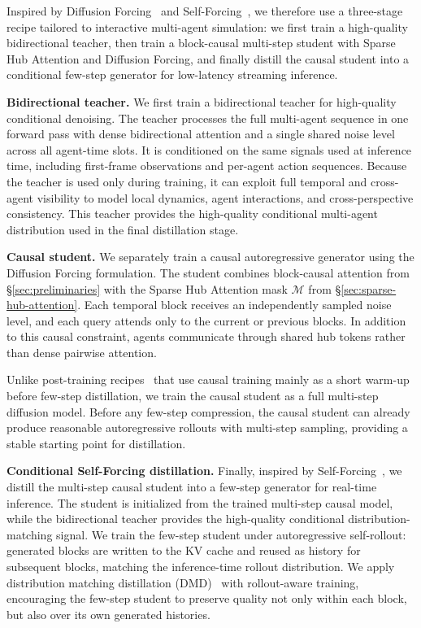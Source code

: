 \documentclass{llmxive}
\begin{document}
Inspired by Diffusion Forcing~\cite{chen2024diffusion} and Self-Forcing~\cite{huang2025self}, we therefore use a three-stage recipe tailored to interactive multi-agent simulation: we first train a high-quality bidirectional teacher, then train a block-causal multi-step student with Sparse Hub Attention and Diffusion Forcing, and finally distill the causal student into a conditional few-step generator for low-latency streaming inference.



\noindent\textbf{Bidirectional teacher.}
We first train a bidirectional teacher for high-quality conditional denoising.
The teacher processes the full multi-agent sequence in one forward pass with dense bidirectional attention and a single shared noise level across all agent-time slots.
It is conditioned on the same signals used at inference time, including first-frame observations and per-agent action sequences.
Because the teacher is used only during training, it can exploit full temporal and cross-agent visibility to model local dynamics, agent interactions, and cross-perspective consistency.
This teacher provides the high-quality conditional multi-agent distribution used in the final distillation stage.

\noindent\textbf{Causal student.}
We separately train a causal autoregressive generator using the Diffusion Forcing formulation. 
The student combines block-causal attention from \S\ref{sec:preliminaries} with the Sparse Hub Attention mask $\mathcal{M}$ from \S\ref{sec:sparse-hub-attention}.
Each temporal block receives an independently sampled noise level, and each query attends only to the current or previous blocks.
In addition to this causal constraint, agents communicate through shared hub tokens rather than dense pairwise attention.

Unlike post-training recipes~\cite{huang2025self,yin2025slow} that use causal training mainly as a short warm-up before few-step distillation, we train the causal student as a full multi-step diffusion model. Before any few-step compression, the causal student can already produce reasonable autoregressive rollouts with multi-step sampling, providing a stable starting point for distillation.


\noindent\textbf{Conditional Self-Forcing distillation.}
Finally, inspired by Self-Forcing~\cite{huang2025self}, we distill the multi-step causal student into a few-step generator for real-time inference.
The student is initialized from the trained multi-step causal model, while the bidirectional teacher provides the high-quality conditional distribution-matching signal.
We train the few-step student under autoregressive self-rollout: generated blocks are written to the KV cache and reused as history for subsequent blocks, matching the inference-time rollout distribution.
We apply distribution matching distillation (DMD)~\cite{yin2024one} with rollout-aware training, encouraging the few-step student to preserve quality not only within each block, but also over its own generated histories.
\end{document}
